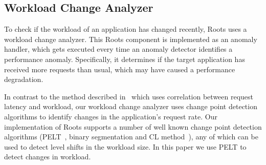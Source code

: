 
\subsection{Workload Change Analyzer}

To check if the workload of an application has changed recently, Roots uses a workload change analyzer.
This Roots component  is implemented as an anomaly handler, which gets executed every time an 
anomaly detector
identifies a performance anomaly. 
Specifically, it determines if the target application has received more requests than usual, which
may have caused a performance degradation.

In contrast to the method described 
in~\cite{Magalhaes:2010:DPA:1906485.1906774,
Magalhaes:2011:RAP:1982185.1982234} which uses correlation between request
latency and workload, our 
workload change analyzer uses change point detection algorithms to 
identify changes in
the application's request rate. 
Our implementation of Roots supports a number of well known change point
detection algorithms (PELT~\cite{doi:10.1080/01621459.2012.737745}, binary segmentation 
and CL method~\cite{chen1993joint}), any of which can be used to detect level shifts in the
workload size.  In this paper we use PELT to detect changes in workload.

